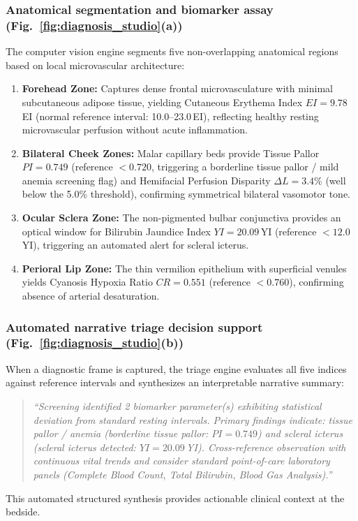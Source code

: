 \documentclass[journal]{IEEEtran}
\begin{document}
\subsubsection{Anatomical segmentation and biomarker assay (Fig.~\ref{fig:diagnosis_studio}(a))}
The computer vision engine segments five non-overlapping anatomical regions based on local microvascular architecture:
\begin{enumerate}
  \item \textbf{Forehead Zone:} Captures dense frontal microvasculature with minimal subcutaneous adipose tissue, yielding Cutaneous Erythema Index $EI = 9.78$\,EI (normal reference interval: 10.0--23.0\,EI), reflecting healthy resting microvascular perfusion without acute inflammation.
  \item \textbf{Bilateral Cheek Zones:} Malar capillary beds provide Tissue Pallor $PI = 0.749$ (reference $<0.720$, triggering a borderline tissue pallor / mild anemia screening flag) and Hemifacial Perfusion Disparity $\Delta L = 3.4\%$ (well below the 5.0\% threshold), confirming symmetrical bilateral vasomotor tone.
  \item \textbf{Ocular Sclera Zone:} The non-pigmented bulbar conjunctiva provides an optical window for Bilirubin Jaundice Index $YI = 20.09$\,YI (reference $<12.0$\,YI), triggering an automated alert for scleral icterus.
  \item \textbf{Perioral Lip Zone:} The thin vermilion epithelium with superficial venules yields Cyanosis Hypoxia Ratio $CR = 0.551$ (reference $<0.760$), confirming absence of arterial desaturation.
\end{enumerate}

\subsubsection{Automated narrative triage decision support (Fig.~\ref{fig:diagnosis_studio}(b))}
When a diagnostic frame is captured, the triage engine evaluates all five indices against reference intervals and synthesizes an interpretable narrative summary:
\begin{quote}
  \textit{``Screening identified 2 biomarker parameter(s) exhibiting statistical deviation from standard resting intervals. Primary findings indicate: tissue pallor / anemia (borderline tissue pallor: $PI = 0.749$) and scleral icterus (scleral icterus detected: $YI = 20.09$\,YI). Cross-reference observation with continuous vital trends and consider standard point-of-care laboratory panels (Complete Blood Count, Total Bilirubin, Blood Gas Analysis).''}
\end{quote}
This automated structured synthesis provides actionable clinical context at the bedside.
\end{document}
